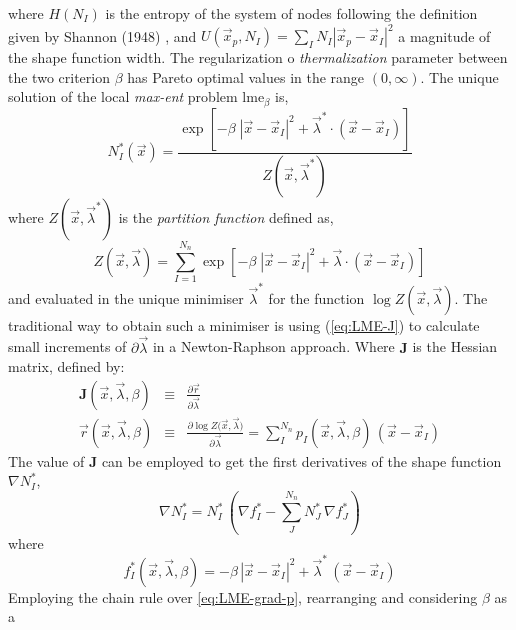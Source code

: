 \documentclass[preprint,12pt,a4paper]{elsarticle}
\newcommand{\tens}[1]{
  \ensuremath{\mathbf{{#1}}}
}
\begin{document}
where $H(N_I)$ is the entropy of the system of nodes following the
definition given by Shannon (1948) \cite{Shannon1948}, and $U(\vec{x}_p,N_I) =
\sum_I N_I |\vec{x}_p - \vec{x}_I |^2$ a magnitude of the shape
function width. The regularization o \textit{thermalization} parameter
between the two criterion $\beta$ has Pareto optimal values in the
range $(0,\infty)$. The unique solution of the local \textit{max-ent} problem
 \acrshort{lme}$_\beta$ is,
 \begin{equation}
  \label{eq:LME-p}
N_I^*(\vec{x})=\frac{\exp\left[ -\beta \; |\vec{x}-\vec{x}_I|^2 +
    \vec{\lambda}^* \cdot (\vec{x}-\vec{x}_I) \right] } {Z(\vec{x},\vec{\lambda}^*)}
\end{equation}
where $Z(\vec{x},\vec{\lambda}^*)$ is the \textit{partition function} defined as,
\begin{equation}
  \label{eq:LME-Z}
Z(\vec{x}, {\vec{\lambda}}) = \sum_{I=1}^{N_n}{ \exp \left[ -\beta \; |\vec{x}-\vec{x}_I|^2 + \vec{\lambda} \cdot (\vec{x}-\vec{x}_I)  \right]}
\end{equation}
and evaluated in the unique minimiser $\vec{\lambda}^*$ for the function $\log
Z(\vec{x}, \vec{\lambda})$. The traditional way to obtain
such a minimiser is using (\ref{eq:LME-J}) to calculate small
increments of $\partial\vec{\lambda}$ in a Newton-Raphson
approach. Where $\tens{J}$ is the Hessian matrix, defined by:
\begin{eqnarray}
  \label{eq:LME-J} 
  \tens{J}(\vec{x}, \vec{\lambda},\beta) &\equiv& \frac{\partial
                                                  \vec{r}}{\partial \vec{\lambda}}\\
  \label{eq:LME-r}
  \vec{r}(\vec{x},\vec{\lambda},\beta) &\equiv& \frac{\partial \log{ Z(   \vec{x},\vec{\lambda}})}{\partial \vec{\lambda}}  = \sum_I^{N_n} p_I(\vec{x},\vec{\lambda},\beta) \, (\vec{x} - \vec{x}_I)
\end{eqnarray}
The value of $\tens{J}$ can be employed to get the first derivatives of the shape function $\nabla
N^*_I$,
\begin{equation}
  \label{eq:LME-grad-p}
\nabla N^*_I = N^*_I  \, \left(\nabla f^*_I-\sum_J^{N_n} N^*_J \, \nabla f^*_J\right)
\end{equation}
where
\begin{equation}
  \label{eq:LME-f}
f^*_I(\vec{x},  \vec{\lambda},\beta)=-\beta \, |\vec{x}-\vec{x}_I|^2 + \vec{\lambda}^*  \,  (\vec{x}-\vec{x}_I)
\end{equation}
Employing the chain rule over \eqref{eq:LME-grad-p}, rearranging and considering $\beta$ as a
\end{document}
